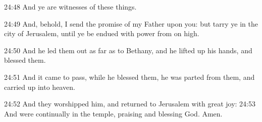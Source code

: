 24:48 And ye are witnesses of these things.

24:49 And, behold, I send the promise of my Father upon you: but tarry ye in the city of Jerusalem, until ye be endued with power from on high.

24:50 And he led them out as far as to Bethany, and he lifted up his hands, and blessed them.

24:51 And it came to pass, while he blessed them, he was parted from them, and carried up into heaven.

24:52 And they worshipped him, and returned to Jerusalem with great joy: 24:53 And were continually in the temple, praising and blessing God. Amen.

